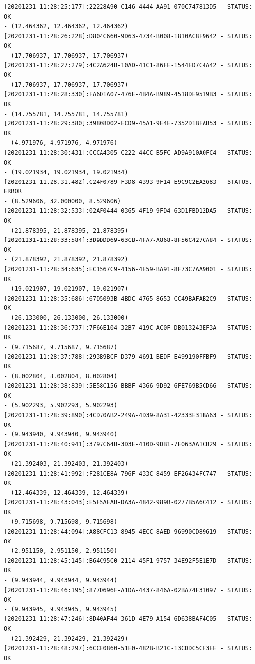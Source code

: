 \documentclass[11pt, oneside]{article}   	%
\begin{document}
\begin{Verbatim}[frame=topline,
			framesep=4mm,
			label=\fbox{\Large{STATUS\_20201231.log}}]
[20201231-11:28:25:177]:22228A90-C146-4444-AA91-070C747813D5 - STATUS: OK        
- (12.464362, 12.464362, 12.464362)
[20201231-11:28:26:228]:D804C660-9D63-4734-B008-1810AC8F9642 - STATUS: OK        
- (17.706937, 17.706937, 17.706937)
[20201231-11:28:27:279]:4C2A624B-10AD-41C1-86FE-1544ED7C4A42 - STATUS: OK        
- (17.706937, 17.706937, 17.706937)
[20201231-11:28:28:330]:FA6D1A07-476E-4B4A-B989-4518DE9519B3 - STATUS: OK        
- (14.755781, 14.755781, 14.755781)
[20201231-11:28:29:380]:39808D02-ECD9-45A1-9E4E-7352D1BFAB53 - STATUS: OK        
- (4.971976, 4.971976, 4.971976)
[20201231-11:28:30:431]:CCCA4305-C222-44CC-B5FC-AD9A910A0FC4 - STATUS: OK        
- (19.021934, 19.021934, 19.021934)
[20201231-11:28:31:482]:C24F0789-F3D8-4393-9F14-E9C9C2EA2683 - STATUS: ERROR     
- (8.529606, 32.000000, 8.529606)
[20201231-11:28:32:533]:02AF0444-0365-4F19-9FD4-63D1FBD12DA5 - STATUS: OK        
- (21.878395, 21.878395, 21.878395)
[20201231-11:28:33:584]:3D9DDD69-63CB-4FA7-A868-8F56C427CA84 - STATUS: OK        
- (21.878392, 21.878392, 21.878392)
[20201231-11:28:34:635]:EC1567C9-4156-4E59-BA91-8F73C7AA9001 - STATUS: OK        
- (19.021907, 19.021907, 19.021907)
[20201231-11:28:35:686]:67D5093B-4BDC-4765-8653-CC49BAFAB2C9 - STATUS: OK        
- (26.133000, 26.133000, 26.133000)
[20201231-11:28:36:737]:7F66E104-32B7-419C-AC0F-DB013243EF3A - STATUS: OK        
- (9.715687, 9.715687, 9.715687)
[20201231-11:28:37:788]:293B9BCF-D379-4691-BEDF-E499190FFBF9 - STATUS: OK        
- (8.002804, 8.002804, 8.002804)
[20201231-11:28:38:839]:5E58C156-BBBF-4366-9D92-6FE769B5CD66 - STATUS: OK        
- (5.902293, 5.902293, 5.902293)
[20201231-11:28:39:890]:4CD70AB2-249A-4D39-8A31-42333E31BA63 - STATUS: OK        
- (9.943940, 9.943940, 9.943940)
[20201231-11:28:40:941]:3797C64B-3D3E-410D-9DB1-7E063AA1CB29 - STATUS: OK        
- (21.392403, 21.392403, 21.392403)
[20201231-11:28:41:992]:F281CE8A-796F-433C-8459-EF26434FC747 - STATUS: OK        
- (12.464339, 12.464339, 12.464339)
[20201231-11:28:43:043]:E5F5AEAB-DA3A-4842-989B-0277B5A6C412 - STATUS: OK        
- (9.715698, 9.715698, 9.715698)
[20201231-11:28:44:094]:A88CFC13-8945-4ECC-8AED-96990CD89619 - STATUS: OK        
- (2.951150, 2.951150, 2.951150)
[20201231-11:28:45:145]:B64C95C0-2114-45F1-9757-34E92F5E1E7D - STATUS: OK        
- (9.943944, 9.943944, 9.943944)
[20201231-11:28:46:195]:877D696F-A1DA-4437-846A-02BA74F31097 - STATUS: OK        
- (9.943945, 9.943945, 9.943945)
[20201231-11:28:47:246]:8D40AF44-361D-4E79-A154-6D638BAF4C05 - STATUS: OK        
- (21.392429, 21.392429, 21.392429)
[20201231-11:28:48:297]:6CCE0860-51E0-482B-B21C-13CDDC5CF3EE - STATUS: OK        

\end{Verbatim}
\end{document}
